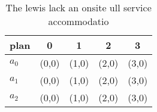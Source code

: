 \documentclass[a4paper]{article}
\begin{document}
\begin{table}
\begin{adjustbox}{width=0.6\columnwidth}
\begin{tabular}{|l|l|l|l|l|}
\hline
\textbf{plan} & \multicolumn{1}{c|}{\textbf{0}} & \multicolumn{1}{c|}{\textbf{1}} & \multicolumn{1}{c|}{\textbf{2}} & \multicolumn{1}{c|}{\textbf{3}} \\ \hline
\textbf{$a_0$}  & (0,0) & (1,0) & (2,0) & (3,0) \\ \hline
\textbf{$a_1$}  & (0,0) & (1,0) & (2,0) & (3,0) \\ \hline
\textbf{$a_2$}  & (0,0) & (1,0) & (2,0) & (3,0) \\ \hline
\end{tabular}
\end{adjustbox}
\caption{The lewis lack an onsite ull service accommodatio
}
\end{table}
\end{document}
